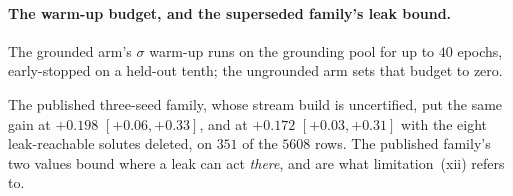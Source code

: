 
\paragraph{The warm-up budget, and the superseded family's leak bound.}
The grounded arm's $\sigma$ warm-up runs on the grounding pool for up to $40$ epochs, early-stopped
on a held-out tenth; the ungrounded arm sets that budget to zero.

The published three-seed family, whose stream build is uncertified, put the same gain at
$+0.198$ $[+0.06,+0.33]$, and at
$+0.172$ $[+0.03,+0.31]$ with the eight leak-reachable solutes deleted, on $351$ of the $5608$ rows.
The published family's two values bound where a leak can act \emph{there}, and are what
limitation~(xii) refers to.

